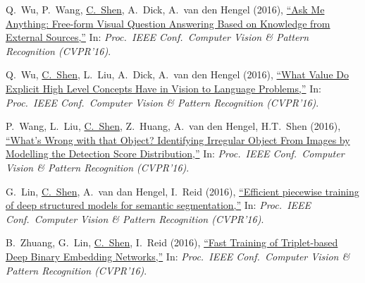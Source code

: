 \documentclass[9pt, a4paper]{article}
\newcommand{\years}[1]{\marginnote{\scriptsize #1}}
\def\highlight{\uline}
\begin{document}
\medskip

\years{2016} Q.~Wu, P.~Wang, \highlight{C.~Shen}, A.~Dick, A.~van den Hengel (2016),
\href{http://www.google.com/search?lr=&ie=UTF-8&oe=UTF-8&q=Ask+Me+Anything%3A+Free-form+Visual+Question+Answering+Based+on+Knowledge+from+External+Sources+Qi+Wu%2C+Peng+Wang%2C+Chunhua+Shen%2C+Anthony+Dick%2C+Anton+van+den+Hengel}{``Ask Me Anything: Free-form Visual Question Answering Based on Knowledge from External Sources,{}''}
In: \emph{Proc.\ IEEE Conf.\  Computer Vision \& Pattern Recognition (CVPR'16)}.

\medskip

\years{2016} Q.~Wu, \highlight{C.~Shen}, L.~Liu, A.~Dick, A.~van den Hengel (2016),
\href{http://www.google.com/search?lr=&ie=UTF-8&oe=UTF-8&q=What+Value+Do+Explicit+High+Level+Concepts+Have+in+Vision+to+Language+Problems+Qi+Wu%2C+Chunhua+Shen%2C+Lingqiao+Liu%2C+Anthony+Dick%2C+Anton+van+den+Hengel}{``What Value Do Explicit High Level Concepts Have in Vision to Language Problems,{}''}
In: \emph{Proc.\ IEEE Conf.\  Computer Vision \& Pattern Recognition (CVPR'16)}.

\medskip

\years{2016} P.~Wang, L.~Liu, \highlight{C.~Shen}, Z.~Huang, A.~van den Hengel, H.T.~Shen (2016),
\href{http://www.google.com/search?lr=&ie=UTF-8&oe=UTF-8&q=What%27s+Wrong+with+that+Object%3F+Identifying+Irregular+Object+From+Images+by+Modelling+the+Detection+Score+Distribution+Peng+Wang%2C+Lingqiao+Liu%2C+Chunhua+Shen%2C+Zi+Huang%2C+Anton+van+den+Hengel%2C+Heng+Tao+Shen}{``What's Wrong with that Object? Identifying Irregular Object From Images by Modelling the Detection Score Distribution,{}''}
In: \emph{Proc.\ IEEE Conf.\  Computer Vision \& Pattern Recognition (CVPR'16)}.

\medskip

\years{2016} G.~Lin, \highlight{C.~Shen}, A.~van dan Hengel, I.~Reid (2016),
\href{http://www.google.com/search?lr=&ie=UTF-8&oe=UTF-8&q=Efficient+piecewise+training+of+deep+structured+models+for+semantic+segmentation+Guosheng+Lin%2C+Chunhua+Shen%2C+Anton+van+dan+Hengel%2C+Ian+Reid}{``Efficient piecewise training of deep structured models for semantic segmentation,{}''}
In: \emph{Proc.\ IEEE Conf.\  Computer Vision \& Pattern Recognition (CVPR'16)}.

\medskip

\years{2016} B.~Zhuang, G.~Lin, \highlight{C.~Shen}, I.~Reid (2016),
\href{http://www.google.com/search?lr=&ie=UTF-8&oe=UTF-8&q=Fast+Training+of+Triplet-based+Deep+Binary+Embedding+Networks+Bohan+Zhuang%2C+Guosheng+Lin%2C+Chunhua+Shen%2C+Ian+Reid}{``Fast Training of Triplet-based Deep Binary Embedding Networks,{}''}
In: \emph{Proc.\ IEEE Conf.\  Computer Vision \& Pattern Recognition (CVPR'16)}.
\end{document}
